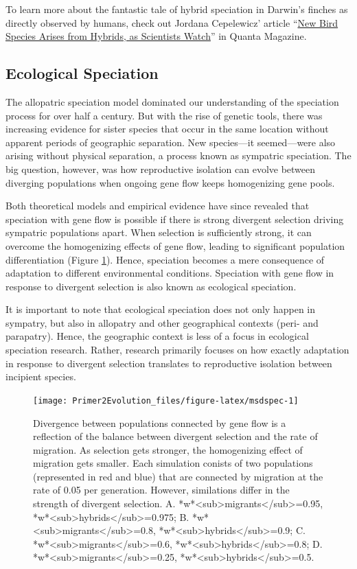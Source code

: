 \documentclass[
]{book}
\begin{document}
To learn more about the fantastic tale of hybrid speciation in Darwin's finches as directly observed by humans, check out Jordana Cepelewicz' article ``\href{https://www.quantamagazine.org/new-bird-species-arises-from-hybrids-as-scientists-watch-20171213/}{New Bird Species Arises from Hybrids, as Scientists Watch}'' in Quanta Magazine.

\hypertarget{ecological-speciation}{%
\subsection{Ecological Speciation}\label{ecological-speciation}}

The allopatric speciation model dominated our understanding of the speciation process for over half a century. But with the rise of genetic tools, there was increasing evidence for sister species that occur in the same location without apparent periods of geographic separation. New species---it seemed---were also arising without physical separation, a process known as sympatric speciation. The big question, however, was how reproductive isolation can evolve between diverging populations when ongoing gene flow keeps homogenizing gene pools.

Both theoretical models and empirical evidence have since revealed that speciation with gene flow is possible if there is strong divergent selection driving sympatric populations apart. When selection is sufficiently strong, it can overcome the homogenizing effects of gene flow, leading to significant population differentiation (Figure \ref{fig:msdspec}). Hence, speciation becomes a mere consequence of adaptation to different environmental conditions. Speciation with gene flow in response to divergent selection is also known as ecological speciation.

It is important to note that ecological speciation does not only happen in sympatry, but also in allopatry and other geographical contexts (peri- and parapatry). Hence, the geographic context is less of a focus in ecological speciation research. Rather, research primarily focuses on how exactly adaptation in response to divergent selection translates to reproductive isolation between incipient species.

\begin{figure}
\texttt{[image: Primer2Evolution\_files/figure-latex/msdspec-1]} \caption{Divergence between populations connected by gene flow is a reflection of the balance between divergent selection and the rate of migration. As selection gets stronger, the homogenizing effect of migration gets smaller. Each simulation conists of two populations (represented in red and blue) that are connected by migration at the rate of 0.05 per generation. However, similations differ in the strength of divergent selection. A. *w*<sub>migrants</sub>=0.95, *w*<sub>hybrids</sub>=0.975; B. *w*<sub>migrants</sub>=0.8, *w*<sub>hybrids</sub>=0.9; C. *w*<sub>migrants</sub>=0.6, *w*<sub>hybrids</sub>=0.8; D. *w*<sub>migrants</sub>=0.25, *w*<sub>hybrids</sub>=0.5.}\label{fig:msdspec}
\end{figure}
\end{document}
